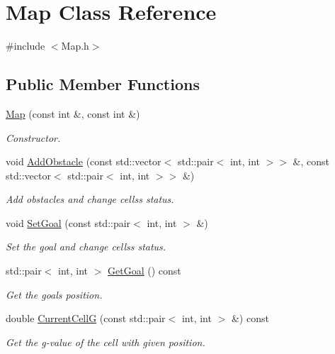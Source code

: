 \hypertarget{classMap}{}\section{Map Class Reference}
\label{classMap}


{\ttfamily \#include $<$Map.\+h$>$}

\subsection*{Public Member Functions}
\begin{DoxyCompactItemize}
\item 
\hyperlink{classMap_a84d193a79ce3fcbe8e5dc5cb9f1c4664}{Map} (const int \&, const int \&)
\begin{DoxyCompactList}\small\item\em Constructor. \end{DoxyCompactList}\item 
void \hyperlink{classMap_a934e51326ce7c074d8fd6b0dab42edaf}{Add\+Obstacle} (const std\+::vector$<$ std\+::pair$<$ int, int $>$$>$ \&, const std\+::vector$<$ std\+::pair$<$ int, int $>$$>$ \&)
\begin{DoxyCompactList}\small\item\em Add obstacles and change cells\textquotesingle{}s status. \end{DoxyCompactList}\item 
void \hyperlink{classMap_a8bf487bae64af3f7395b0e1a485a2058}{Set\+Goal} (const std\+::pair$<$ int, int $>$ \&)
\begin{DoxyCompactList}\small\item\em Set the goal and change cells\textquotesingle{}s status. \end{DoxyCompactList}\item 
std\+::pair$<$ int, int $>$ \hyperlink{classMap_a6d7140803e7966217802c36b85a42d53}{Get\+Goal} () const 
\begin{DoxyCompactList}\small\item\em Get the goal\textquotesingle{}s position. \end{DoxyCompactList}\item 
double \hyperlink{classMap_aae2c27feb5f547122e9ea2639770a8d6}{Current\+CellG} (const std\+::pair$<$ int, int $>$ \&) const 
\begin{DoxyCompactList}\small\item\em Get the g-\/value of the cell with given position. \end{DoxyCompactList}\item 

\end{DoxyCompactItemize}
